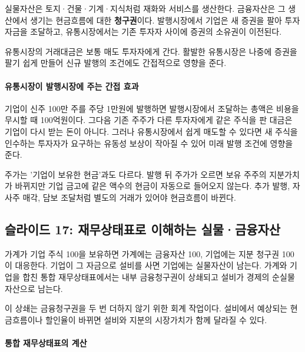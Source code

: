 \documentclass[11pt,a4paper]{article}
\begin{document}
실물자산은 토지·건물·기계·지식처럼 재화와 서비스를 생산한다. 금융자산은 그 생산에서 생기는 현금흐름에 대한 \textbf{청구권}이다. 발행시장에서 기업은 새 증권을 팔아 투자 자금을 조달하고, 유통시장에서는 기존 투자자 사이에 증권의 소유권이 이전된다.
\par

유통시장의 거래대금은 보통 매도 투자자에게 간다. 활발한 유통시장은 나중에 증권을 팔기 쉽게 만들어 신규 발행의 조건에도 간접적으로 영향을 준다.
\par

\paragraph{유통시장이 발행시장에 주는 간접 효과}

기업이 신주 100만 주를 주당 1만원에 발행하면 발행시장에서 조달하는 총액은 비용을 무시할 때 100억원이다. 그다음 기존 주주가 다른 투자자에게 같은 주식을 판 대금은 기업이 다시 받는 돈이 아니다. 그러나 유통시장에서 쉽게 매도할 수 있다면 새 주식을 인수하는 투자자가 요구하는 유동성 보상이 작아질 수 있어 미래 발행 조건에 영향을 준다.
\par

주가는 '기업이 보유한 현금'과도 다르다. 발행 뒤 주가가 오르면 보유 주주의 지분가치가 바뀌지만 기업 금고에 같은 액수의 현금이 자동으로 들어오지 않는다. 추가 발행, 자사주 매각, 담보 조달처럼 별도의 거래가 있어야 현금흐름이 바뀐다.
\par

\subsection{슬라이드 17: 재무상태표로 이해하는 실물·금융자산}

가계가 기업 주식 100을 보유하면 가계에는 금융자산 100, 기업에는 지분 청구권 100이 대응한다. 기업이 그 자금으로 설비를 사면 기업에는 실물자산이 남는다. 가계와 기업을 합친 통합 재무상태표에서는 내부 금융청구권이 상쇄되고 설비가 경제의 순실물자산으로 남는다.
\par

이 상쇄는 금융청구권을 두 번 더하지 않기 위한 회계 작업이다. 설비에서 예상되는 현금흐름이나 할인율이 바뀌면 설비와 지분의 시장가치가 함께 달라질 수 있다.
\par

\paragraph{통합 재무상태표의 계산}
\end{document}
